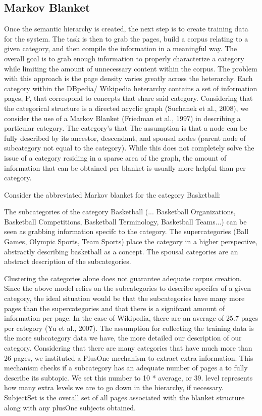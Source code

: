 \documentclass{www2010-submission}
\begin{document}
\subsection*{Markov Blanket}
Once the semantic hierarchy is created, the next step is to create training data for the system. The task is then to grab the pages, build a corpus relating to a given category, and then compile the information in a meaningful way. The overall goal is to grab enough information to properly characterize a category while limiting the amount of unnecessary content within the corpus. The problem with this approach is the page density varies greatly across the heterarchy. Each category within the DBpedia/ Wikipedia heterarchy contains a set of information pages, P, that correspond to concepts that share said category. Considering that the categorical structure is a directed acyclic graph (Suchanek et al., 2008), we consider the use of a Markov Blanket (Friedman et al., 1997) in describing a particular category. The category's that The assumption is that a node can be fully described by its ancestor, descendant, and spousal nodes (parent node of subcategory not equal to the category). While this does not completely solve the issue of a category residing in a sparse area of the graph, the amount of information that can be obtained per blanket is usually more helpful than per category.

Consider the abbreviated Markov blanket for the category Basketball:

The subcategories of the category Basketball (... Basketball Organizations, Basketball Competitions, Basketball Terminology, Basketball Teams...) can be seen as grabbing information specifc to the category. The supercategories (Ball Games, Olympic Sports, Team Sports) place the category in a higher perspective, abstractly describing basketball as a concept. The spousal categories are an abstract description of the subcategories.

Clustering the categories alone does not guarantee adequate corpus creation. Since the above model relies on the subcategories to describe specifcs of a given category, the ideal situation would be that the subcategories have many more pages than the supercategories and that there is a signifcant amount of information per page. In the case of Wikipedia, there are an average of 25.7 pages per category (Yu et al., 2007). The assumption for collecting the training data is the more subcategory data we have, the more detailed our description of our category. Considering that there are many categories that have much more than 26 pages, we instituted a PlusOne mechanism to extract extra information. This mechanism checks if a subcategory has an adequate number of pages a to fully describe its subtopic. We set this number to 10 * average, or 39. level represents how many extra levels we are to go down in the hierarchy, if necessary. SubjectSet is the overall set of all pages associated with the blanket structure along with any plusOne subjects obtained.
\end{document}
